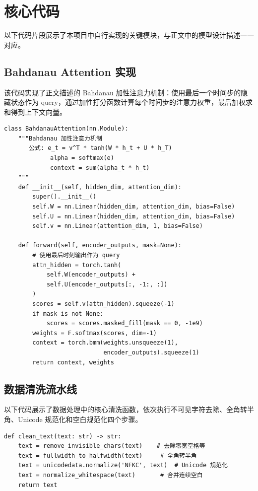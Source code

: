 \section{核心代码}

以下代码片段展示了本项目中自行实现的关键模块，与正文中的模型设计描述一一对应。

\subsection{Bahdanau Attention 实现}

该代码实现了正文描述的 Bahdanau 加性注意力机制：使用最后一个时间步的隐藏状态作为 query，通过加性打分函数计算每个时间步的注意力权重，最后加权求和得到上下文向量。

\begin{lstlisting}[style=cleanpython]
class BahdanauAttention(nn.Module):
    """Bahdanau 加性注意力机制
       公式: e_t = v^T * tanh(W * h_t + U * h_T)
             alpha = softmax(e)
             context = sum(alpha_t * h_t)
    """
    def __init__(self, hidden_dim, attention_dim):
        super().__init__()
        self.W = nn.Linear(hidden_dim, attention_dim, bias=False)
        self.U = nn.Linear(hidden_dim, attention_dim, bias=False)
        self.v = nn.Linear(attention_dim, 1, bias=False)

    def forward(self, encoder_outputs, mask=None):
        # 使用最后时刻输出作为 query
        attn_hidden = torch.tanh(
            self.W(encoder_outputs) +
            self.U(encoder_outputs[:, -1:, :])
        )
        scores = self.v(attn_hidden).squeeze(-1)
        if mask is not None:
            scores = scores.masked_fill(mask == 0, -1e9)
        weights = F.softmax(scores, dim=-1)
        context = torch.bmm(weights.unsqueeze(1),
                            encoder_outputs).squeeze(1)
        return context, weights
\end{lstlisting}

\subsection{数据清洗流水线}

以下代码展示了数据处理中的核心清洗函数，依次执行不可见字符去除、全角转半角、Unicode 规范化和空白规范化四个步骤。

\begin{lstlisting}[style=cleanpython]
def clean_text(text: str) -> str:
    text = remove_invisible_chars(text)    # 去除零宽空格等
    text = fullwidth_to_halfwidth(text)     # 全角转半角
    text = unicodedata.normalize('NFKC', text)  # Unicode 规范化
    text = normalize_whitespace(text)       # 合并连续空白
    return text
\end{lstlisting}


